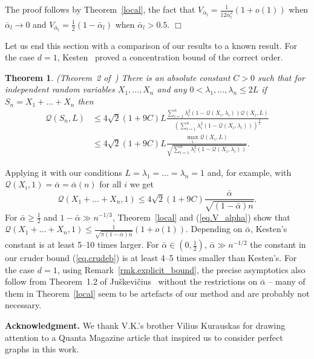 \documentclass{article}
\newenvironment{proofof}[1]{\noindent {\bf Proof of #1}}{\hspace*{\fill}$\Box$}
\newtheorem{theorem}{Theorem}[section]
\newcommand{\conc}{\mathcal{Q}}
\begin{document}
\begin{proofof}{Remark~\ref{rmk.cormain}}
    The proof follows by Theorem~\ref{local}, the fact that
    $V_{\bar{\alpha}_l} = \frac 1 {12 \bar{\alpha}^2_l} (1 + o(1))$ when $\bar{\alpha}_l \to 0$ and $V_{\bar{\alpha}_l} = \frac 1 2 (1-\bar{\alpha}_l)$ when $\bar{\alpha}_l > 0.5$. \end{proofof}

\medskip

Let us end this section with a comparison of our results to a known result. For the case $d=1$, Kesten~\cite{kesten} proved a concentration bound of the correct order. 

\begin{theorem}(Theorem~2 of~\cite{kesten}) 
    There is an absolute constant $C > 0$ such that for independent random variables $X_1, \dots, X_n$ and any  $0<\lambda_1, \dots, \lambda_n \le 2L$ if
$S_n = X_1 + \dots + X_n$ then
\begin{align*}
    \conc(S_n, L) 
    & \le 4 \sqrt 2 (1 + 9 C) L \frac{\sum_{i=1}^n \lambda_i^2 (1-\conc(X_i, \lambda_i))\conc(X_i, L)}{\left(\sum_{i=1}^n \lambda_i^2 (1 - \conc(X_i, \lambda_i))\right)^{\frac 3 2}}
    \\ &
    \le 4 \sqrt 2 (1 + 9 C) L \frac{\max_{i} \conc(X_i, L)}{\sqrt{\sum_{i=1}^n \lambda_i^2 (1 - \conc(X_i, \lambda_i))}}.
\end{align*}
\end{theorem}
Applying it with our conditions $L = \lambda_1 = \dots = \lambda_n = 1$ and, for example, with $\conc(X_i, 1) = \bar{\alpha}=\bar{\alpha}(n)$ for all $i$ we get
\[
    \conc(X_1 + \dots + X_n, 1) 
    \le 4 \sqrt 2 (1 + 9 C)  \frac{\bar{\alpha}}{\sqrt{(1 - \bar{\alpha})n}}.
\]
For $\bar{\alpha} \ge \frac 1 2$ and $1 - \bar{\alpha} \gg n^{-1/3}$, Theorem~\ref{local} and (\ref{eq.V_alpha}) show that $\conc(X_1 + \dots + X_n, 1) \le \frac 1 {\sqrt {{\pi (1-\bar{\alpha})n}}} (1+o(1))$. Depending on $\bar{\alpha}$, Kesten's constant is at least 5--10 times larger. For $\bar{\alpha} \in (0, \frac 1 2)$, $\bar{\alpha} \gg n^{-1/2}$
the constant in our cruder bound (\ref{eq.crudeb}) is at least 4--5 times smaller than Kesten's. For the case $d=1$, using Remark~\ref{rmk.explicit_bound}, the precise asymptotics also follow from Theorem~1.2 of Juškevičius~\cite{tj} without the restrictions on $\bar{\alpha}$ -- many of them in Theorem~\ref{local} seem to be artefacts of our method and are probably not necessary.


\bigskip

\textbf{Acknowledgment.} We thank V.K.'s brother Vilius Kurauskas for drawing attention to a Quanta Magazine article that inspired us to consider perfect graphs in this work.
\end{document}

